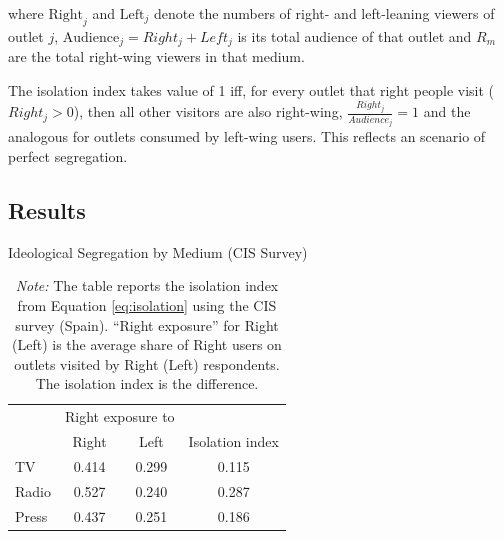 \documentclass[12pt]{article}
\begin{document}
%
where $\mathrm{Right}_j$ and $\mathrm{Left}_j$ denote the numbers of right- and left-leaning viewers of outlet $j$, $\text{Audience}_j=Right_j + Left_j$ is its total audience of that outlet and $R_m$ are the total right-wing viewers in that medium. 

The isolation index takes value of 1 iff, for every outlet that right people visit ($Right_j>0$), then all other visitors are also right-wing, $\frac{Right_j}{Audience_j}=1$ and the analogous for outlets consumed by left-wing users. This reflects an scenario of perfect segregation. 




	\subsection{Results}
\FloatBarrier	
	
	\begin{table}[H]
		\caption{Ideological Segregation by Medium (CIS Survey)}
		\label{tab:isolation_table}
		
		\centering
		\begin{tabular}{lccc}
			\hline
			& \multicolumn{2}{c}{Right exposure to } & \\
			\cline{2-3}
			& Right & Left & Isolation index \\
			\hline
			TV    & 0.414 & 0.299 & 0.115 \\
			Radio & 0.527 & 0.240 & 0.287 \\
			Press & 0.437 & 0.251 & 0.186 \\
			\hline
		\end{tabular}
		

		
		\caption*{\small  \textit{Note:} The table reports the isolation index from Equation \eqref{eq:isolation}  using the CIS survey (Spain). “Right exposure” for Right (Left) is the average share of Right users on outlets visited by Right (Left) respondents. The isolation index is the difference.}
		
	\end{table}
	
	
	
\end{document}
